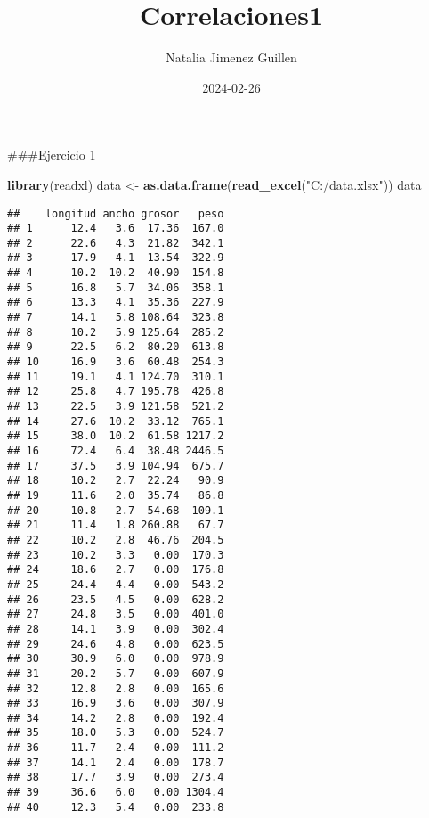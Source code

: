 \documentclass[
]{article}
\title{Correlaciones1}
\author{Natalia Jimenez Guillen}
\date{2024-02-26}
\newenvironment{Shaded}{\begin{snugshade}}{\end{snugshade}}
\newcommand{\FunctionTok}[1]{\textcolor[rgb]{0.13,0.29,0.53}{\textbf{#1}}}
\newcommand{\NormalTok}[1]{#1}
\newcommand{\OtherTok}[1]{\textcolor[rgb]{0.56,0.35,0.01}{#1}}
\newcommand{\StringTok}[1]{\textcolor[rgb]{0.31,0.60,0.02}{#1}}
\begin{document}
\maketitle

\#\#\#Ejercicio 1

\begin{Shaded}
\begin{Highlighting}[]
\FunctionTok{library}\NormalTok{(readxl)}
\NormalTok{data }\OtherTok{\textless{}{-}} \FunctionTok{as.data.frame}\NormalTok{(}\FunctionTok{read\_excel}\NormalTok{(}\StringTok{"C:/data.xlsx"}\NormalTok{))}
\NormalTok{data}
\end{Highlighting}
\end{Shaded}

\begin{verbatim}
##    longitud ancho grosor   peso
## 1      12.4   3.6  17.36  167.0
## 2      22.6   4.3  21.82  342.1
## 3      17.9   4.1  13.54  322.9
## 4      10.2  10.2  40.90  154.8
## 5      16.8   5.7  34.06  358.1
## 6      13.3   4.1  35.36  227.9
## 7      14.1   5.8 108.64  323.8
## 8      10.2   5.9 125.64  285.2
## 9      22.5   6.2  80.20  613.8
## 10     16.9   3.6  60.48  254.3
## 11     19.1   4.1 124.70  310.1
## 12     25.8   4.7 195.78  426.8
## 13     22.5   3.9 121.58  521.2
## 14     27.6  10.2  33.12  765.1
## 15     38.0  10.2  61.58 1217.2
## 16     72.4   6.4  38.48 2446.5
## 17     37.5   3.9 104.94  675.7
## 18     10.2   2.7  22.24   90.9
## 19     11.6   2.0  35.74   86.8
## 20     10.8   2.7  54.68  109.1
## 21     11.4   1.8 260.88   67.7
## 22     10.2   2.8  46.76  204.5
## 23     10.2   3.3   0.00  170.3
## 24     18.6   2.7   0.00  176.8
## 25     24.4   4.4   0.00  543.2
## 26     23.5   4.5   0.00  628.2
## 27     24.8   3.5   0.00  401.0
## 28     14.1   3.9   0.00  302.4
## 29     24.6   4.8   0.00  623.5
## 30     30.9   6.0   0.00  978.9
## 31     20.2   5.7   0.00  607.9
## 32     12.8   2.8   0.00  165.6
## 33     16.9   3.6   0.00  307.9
## 34     14.2   2.8   0.00  192.4
## 35     18.0   5.3   0.00  524.7
## 36     11.7   2.4   0.00  111.2
## 37     14.1   2.4   0.00  178.7
## 38     17.7   3.9   0.00  273.4
## 39     36.6   6.0   0.00 1304.4
## 40     12.3   5.4   0.00  233.8
\end{verbatim}
\end{document}
